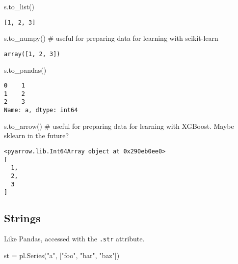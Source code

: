 \documentclass[
  letterpaper,
  DIV=11,
  numbers=noendperiod]{scrartcl}
\newenvironment{Shaded}{\begin{snugshade}}{\end{snugshade}}
\newcommand{\CommentTok}[1]{\textcolor[rgb]{0.37,0.37,0.37}{#1}}
\newcommand{\NormalTok}[1]{\textcolor[rgb]{0.00,0.23,0.31}{#1}}
\newcommand{\OperatorTok}[1]{\textcolor[rgb]{0.37,0.37,0.37}{#1}}
\newcommand{\StringTok}[1]{\textcolor[rgb]{0.13,0.47,0.30}{#1}}
\begin{document}
\begin{Shaded}
\begin{Highlighting}[]
\NormalTok{s.to\_list()}
\end{Highlighting}
\end{Shaded}

\begin{verbatim}
[1, 2, 3]
\end{verbatim}

\begin{Shaded}
\begin{Highlighting}[]
\NormalTok{s.to\_numpy() }\CommentTok{\# useful for preparing data for learning with scikit{-}learn}
\end{Highlighting}
\end{Shaded}

\begin{verbatim}
array([1, 2, 3])
\end{verbatim}

\begin{Shaded}
\begin{Highlighting}[]
\NormalTok{s.to\_pandas()}
\end{Highlighting}
\end{Shaded}

\begin{verbatim}
0    1
1    2
2    3
Name: a, dtype: int64
\end{verbatim}

\begin{Shaded}
\begin{Highlighting}[]
\NormalTok{s.to\_arrow() }\CommentTok{\# useful for preparing data for learning with XGBoost. Maybe sklearn in the future?}
\end{Highlighting}
\end{Shaded}

\begin{verbatim}
<pyarrow.lib.Int64Array object at 0x290eb0ee0>
[
  1,
  2,
  3
]
\end{verbatim}

\hypertarget{strings}{%
\subsection{Strings}\label{strings}}

Like Pandas, accessed with the \texttt{.str} attribute.

\begin{Shaded}
\begin{Highlighting}[]
\NormalTok{st }\OperatorTok{=}\NormalTok{ pl.Series(}\StringTok{"a"}\NormalTok{, [}\StringTok{"foo"}\NormalTok{, }\StringTok{"bar"}\NormalTok{, }\StringTok{"baz"}\NormalTok{])}
\end{Highlighting}
\end{Shaded}
\end{document}
